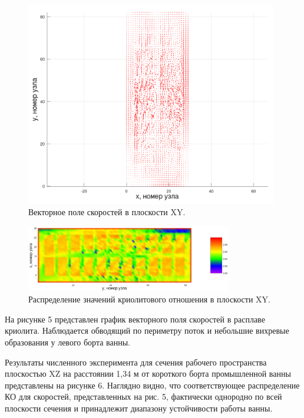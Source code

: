 \documentclass{article}
\begin{document}
\begin{figure}[h!]
    \centering
    \includegraphics[width=110mm]{veloxy_art.png}
    \caption{Векторное поле скоростей в плоскости XY.}
    \label{fig:3dxyvelo} 
\end{figure}

\begin{figure}[h!]
    \centering
    \includegraphics[width=90mm]{3d xy cr.png}
    \caption{Распределение значений криолитового отношения в плоскости XY.}
    \label{fig:3dxycr} 
\end{figure}

На рисунке 5 представлен график векторного поля скоростей в расплаве криолита. Наблюдается обводящий по периметру поток и небольшие вихревые образования у левого борта ванны.

Результаты численного эксперимента для сечения рабочего пространства плоскостью XZ на расстоянии 1,34 м от короткого борта промышленной ванны представлены на рисунке 6. Наглядно видно, что соответствующее распределение КО для скоростей, представленных на рис. 5, фактически однородно по всей плоскости сечения и принадлежит диапазону устойчивости работы ванны. 
\end{document}
